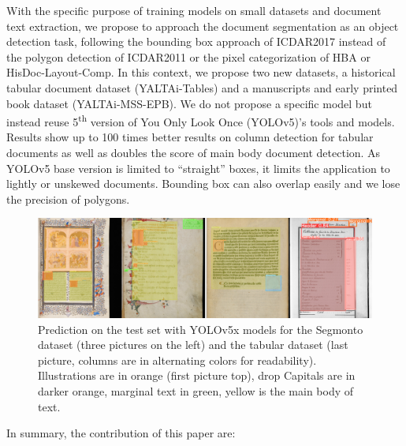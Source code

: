\documentclass{jdmdh}
\begin{document}
With the specific purpose of training models on small datasets and document text extraction, we propose to approach the document segmentation as an object detection task, following the bounding box approach of ICDAR2017 instead of the polygon detection of ICDAR2011 or the pixel categorization of HBA or HisDoc-Layout-Comp. In this context, we propose two new datasets, a historical tabular document dataset (YALTAi-Tables) and a manuscripts and early printed book dataset (YALTAi-MSS-EPB). We do not propose a specific model but instead reuse 5\textsuperscript{th} version of You Only Look Once (YOLOv5)'s tools and models. Results show up to 100 times better results on column detection for tabular documents as well as doubles the score of main body document detection. As YOLOv5 base version is limited to ``straight'' boxes, it limits the application to lightly or unskewed documents. Bounding box can also overlap easily and we lose the precision of polygons.

\begin{figure}[ht]
    \centering
    \includegraphics[width=\linewidth]{images/4images.jpg}
    \caption{Prediction on the test set with YOLOv5x models for the Segmonto dataset (three pictures on the left) and the tabular dataset (last picture, columns are in alternating colors for readability). Illustrations are in orange (first picture top), drop Capitals are in darker orange, marginal text in green, yellow is the main body of text.}
    \label{fig:4images}
\end{figure}

In summary, the contribution of this paper are:
\end{document}
